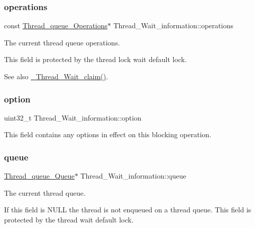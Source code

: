 \subsubsection{\texorpdfstring{operations}{operations}}
{\footnotesize\ttfamily const \mbox{\hyperlink{structThread__queue__Operations}{Thread\+\_\+queue\+\_\+\+Operations}}$\ast$ Thread\+\_\+\+Wait\+\_\+information\+::operations}



The current thread queue operations. 

This field is protected by the thread lock wait default lock.

\begin{DoxySeeAlso}{See also}
\mbox{\hyperlink{group__RTEMSScoreThread_ga032320598e809cb93d80e985906fb393}{\+\_\+\+Thread\+\_\+\+Wait\+\_\+claim()}}. 
\end{DoxySeeAlso}
\mbox{\label{structThread__Wait__information_a5e34b3fb8e24749a4f531a1fb50a7624}} 
\subsubsection{\texorpdfstring{option}{option}}
{\footnotesize\ttfamily uint32\+\_\+t Thread\+\_\+\+Wait\+\_\+information\+::option}

This field contains any options in effect on this blocking operation. \mbox{\label{structThread__Wait__information_a4a6e5aabcc6e723585fb7528bee8090f}} 
\subsubsection{\texorpdfstring{queue}{queue}}
{\footnotesize\ttfamily \mbox{\hyperlink{structThread__queue__Queue}{Thread\+\_\+queue\+\_\+\+Queue}}$\ast$ Thread\+\_\+\+Wait\+\_\+information\+::queue}



The current thread queue. 

If this field is N\+U\+LL the thread is not enqueued on a thread queue. This field is protected by the thread wait default lock.

